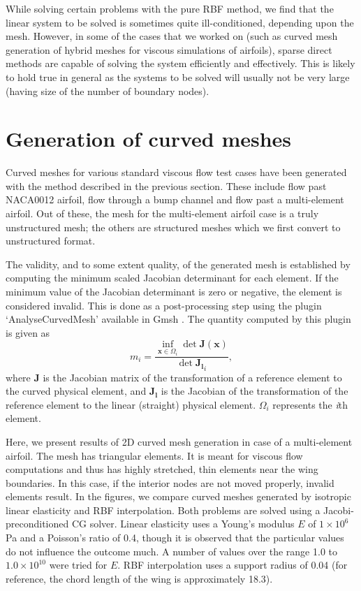  While solving certain problems with the pure RBF method, we find that the linear system to be solved is sometimes quite ill-conditioned, depending upon the mesh. However, in some of the cases that we worked on (such as curved mesh generation of hybrid meshes for viscous simulations of airfoils), sparse direct methods are capable of solving the system efficiently and effectively. This is likely to hold true in general as the systems to be solved will usually not be very large (having size of the number of boundary nodes).
 
 \section{Generation of curved meshes}
 
 Curved meshes for various standard viscous flow test cases have been generated with the method described in the previous section. These include flow past NACA0012 airfoil, flow through a bump channel and flow past a multi-element airfoil. Out of these, the mesh for the multi-element airfoil case is a truly unstructured mesh; the others are structured meshes which we first convert to unstructured format.
 
 The validity, and to some extent quality, of the generated mesh is established by computing the minimum scaled Jacobian determinant for each element. If the minimum value of the Jacobian determinant is zero or negative, the element is considered invalid. This is done as a post-processing step using the plugin `AnalyseCurvedMesh' available in Gmsh \cite{gmsh}. The quantity computed by this plugin is given as
 \begin{equation} 
 m_i = \frac{\inf_{\mathbf{x}\in\Omega_i}\det \mathbf{J}(\mathbf{x})}{\det \mathbf{J_l}_i},
 \end{equation}
 where $\mathbf{J}$ is the Jacobian matrix of the transformation of a reference element to the curved physical element, and $\mathbf{J_l}$ is the Jacobian of the transformation of the reference element to the linear (straight) physical element. $\Omega_i$ represents the \emph{i}th element.
 
 Here, we present results of 2D curved mesh generation in case of a multi-element airfoil. The mesh has triangular elements. It is meant for viscous flow computations and thus has highly stretched, thin elements near the wing boundaries. In this case, if the interior nodes are not moved properly, invalid elements result. In the figures, we compare curved meshes generated by isotropic linear elasticity and RBF interpolation. Both problems are solved using a Jacobi-preconditioned CG solver. Linear elasticity uses a Young's modulus $E$ of $1\times 10^6$ Pa and a Poisson's ratio of 0.4, though it is observed that the particular values do not influence the outcome much. A number of values over the range 1.0 to $1.0 \times 10^{10}$ were tried for $E$. RBF interpolation uses a support radius of 0.04 (for reference, the chord length of the wing is approximately 18.3).
 
